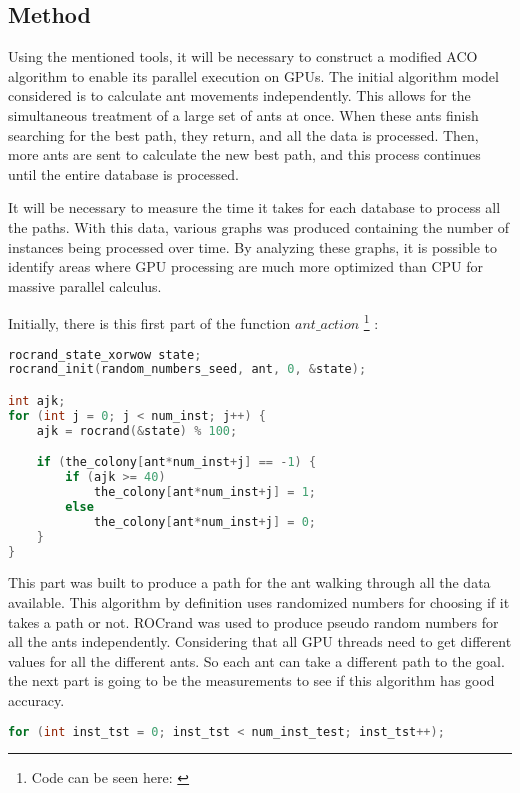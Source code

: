 \subsection{Method} \label{Method}

Using the mentioned tools, it will be necessary to construct a modified ACO algorithm to enable its parallel execution on GPUs. The initial algorithm model considered is to calculate ant movements independently. This allows for the simultaneous treatment of a large set of ants at once. When these ants finish searching for the best path, they return, and all the data is processed. Then, more ants are sent to calculate the new best path, and this process continues until the entire database is processed.

It will be necessary to measure the time it takes for each database to process all the paths. With this data, various graphs was produced containing the number of instances being processed over time. By analyzing these graphs, it is possible to identify areas where GPU processing are much more optimized than CPU for massive parallel calculus.

Initially, there is this first part of the function $ant\_action$ \footnote{Code can be seen here: \cite{santiago_parallel_aco}} :


\begin{lstlisting}[language=c++]
rocrand_state_xorwow state;
rocrand_init(random_numbers_seed, ant, 0, &state);

int ajk;
for (int j = 0; j < num_inst; j++) {
    ajk = rocrand(&state) % 100;

    if (the_colony[ant*num_inst+j] == -1) {
        if (ajk >= 40)
            the_colony[ant*num_inst+j] = 1;
        else
            the_colony[ant*num_inst+j] = 0;
    }
}
\end{lstlisting}

This part was built to produce a path for the ant walking through all the data available.
This algorithm by definition uses randomized numbers for choosing if it takes a path or not.
ROCrand \cite{rocrand} was used to produce pseudo random numbers for all the ants independently.
Considering that all GPU threads need to get different values for all the different ants. So each ant
can take a different path to the goal. the next part is going to be the measurements to see if
this algorithm has good accuracy.

\begin{lstlisting}[language=c++]
for (int inst_tst = 0; inst_tst < num_inst_test; inst_tst++);
\end{lstlisting}

